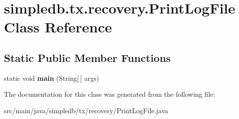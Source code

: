 \hypertarget{classsimpledb_1_1tx_1_1recovery_1_1PrintLogFile}{}\section{simpledb.\+tx.\+recovery.\+Print\+Log\+File Class Reference}
\label{classsimpledb_1_1tx_1_1recovery_1_1PrintLogFile}
\subsection*{Static Public Member Functions}
\begin{DoxyCompactItemize}
\item 
\mbox{\label{classsimpledb_1_1tx_1_1recovery_1_1PrintLogFile_a794dedd417159a2ca385f5955831702f}} 
static void {\bfseries main} (String\mbox{[}$\,$\mbox{]} args)
\end{DoxyCompactItemize}


The documentation for this class was generated from the following file\+:\begin{DoxyCompactItemize}
\item 
src/main/java/simpledb/tx/recovery/Print\+Log\+File.\+java\end{DoxyCompactItemize}
